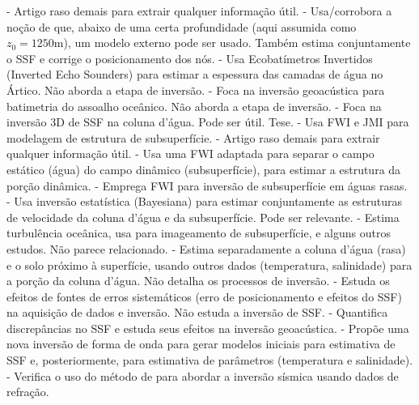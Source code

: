 \begin{itemize}
	 - Artigo raso demais para extrair qualquer informação útil.
	 - Usa/corrobora a noção de que, abaixo de uma certa profundidade (aqui assumida como $z_0 = 1250\si{\meter}$), um modelo externo pode ser usado. Também estima conjuntamente o SSF e corrige o posicionamento dos nós.
	 - Usa Ecobatímetros Invertidos (Inverted Echo Sounders) para estimar a espessura das camadas de água no Ártico. Não aborda a etapa de inversão.
	 - Foca na inversão geoacústica para batimetria do assoalho oceânico. Não aborda a etapa de inversão.
	 - Foca na inversão 3D de SSF na coluna d'água. Pode ser útil. Tese.
	 - Usa FWI e JMI para modelagem de estrutura de subsuperfície.
	 - Artigo raso demais para extrair qualquer informação útil.
	 - Usa uma FWI adaptada para separar o campo estático (água) do campo dinâmico (subsuperfície), para estimar a estrutura da porção dinâmica.
	 - Emprega FWI para inversão de subsuperfície em águas rasas.
	 - Usa inversão estatística (Bayesiana) para estimar conjuntamente as estruturas de velocidade da coluna d'água e da subsuperfície. Pode ser relevante.
	 - Estima turbulência oceânica, usa  para imageamento de subsuperfície, e alguns outros estudos. Não parece relacionado.
	 - Estima separadamente a coluna d'água (rasa) e o solo próximo à superfície, usando outros dados (temperatura, salinidade) para a porção da coluna d'água. Não detalha os processos de inversão.
	 - Estuda os efeitos de fontes de erros sistemáticos (erro de posicionamento e efeitos do SSF) na aquisição de dados e inversão. Não estuda a inversão de SSF.
	 - Quantifica discrepâncias no SSF e estuda seus efeitos na inversão geoacústica.
	 - Propõe uma nova inversão de forma de onda para gerar modelos iniciais para estimativa de SSF e, posteriormente, para estimativa de parâmetros (temperatura e salinidade).
	 - Verifica o uso do método de  para abordar a inversão sísmica usando dados de refração.

\end{itemize}
